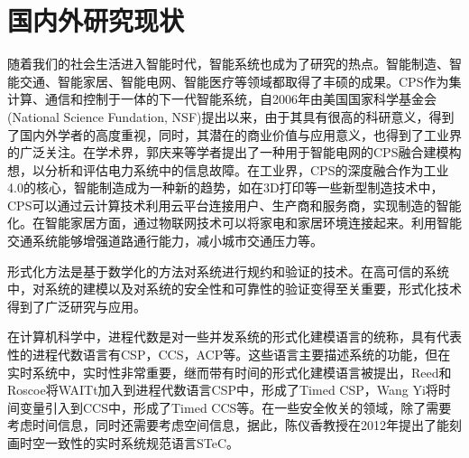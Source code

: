 \section{国内外研究现状}
随着我们的社会生活进入智能时代，智能系统也成为了研究的热点。智能制造、智能交通、智能家居、智能电网、智能医疗等领域都取得了丰硕的成果。CPS作为集计算、通信和控制于一体的下一代智能系统，自2006年由美国国家科学基金会(National Science Fundation, NSF)提出以来，由于其具有很高的科研意义，得到了国内外学者的高度重视，同时，其潜在的商业价值与应用意义，也得到了工业界的广泛关注。在学术界，郭庆来等学者提出了一种用于智能电网的CPS融合建模构想，以分析和评估电力系统中的信息故障。在工业界，CPS的深度融合作为工业4.0的核心，智能制造成为一种新的趋势，如在3D打印等一些新型制造技术中，CPS可以通过云计算技术利用云平台连接用户、生产商和服务商，实现制造的智能化。在智能家居方面，通过物联网技术可以将家电和家居环境连接起来。利用智能交通系统能够增强道路通行能力，减小城市交通压力等。

形式化方法是基于数学化的方法对系统进行规约和验证的技术。在高可信的系统中，对系统的建模以及对系统的安全性和可靠性的验证变得至关重要，形式化技术得到了广泛研究与应用。

在计算机科学中，进程代数是对一些并发系统的形式化建模语言的统称，具有代表性的进程代数语言有CSP，CCS，ACP等。这些语言主要描述系统的功能，但在实时系统中，实时性非常重要，继而带有时间的形式化建模语言被提出，Reed和Roscoe将WAITt加入到进程代数语言CSP中，形成了Timed CSP，Wang Yi将时间变量引入到CCS中，形成了Timed CCS等。在一些安全攸关的领域，除了需要考虑时间信息，同时还需要考虑空间信息，据此，陈仪香教授在2012年提出了能刻画时空一致性的实时系统规范语言STeC。

